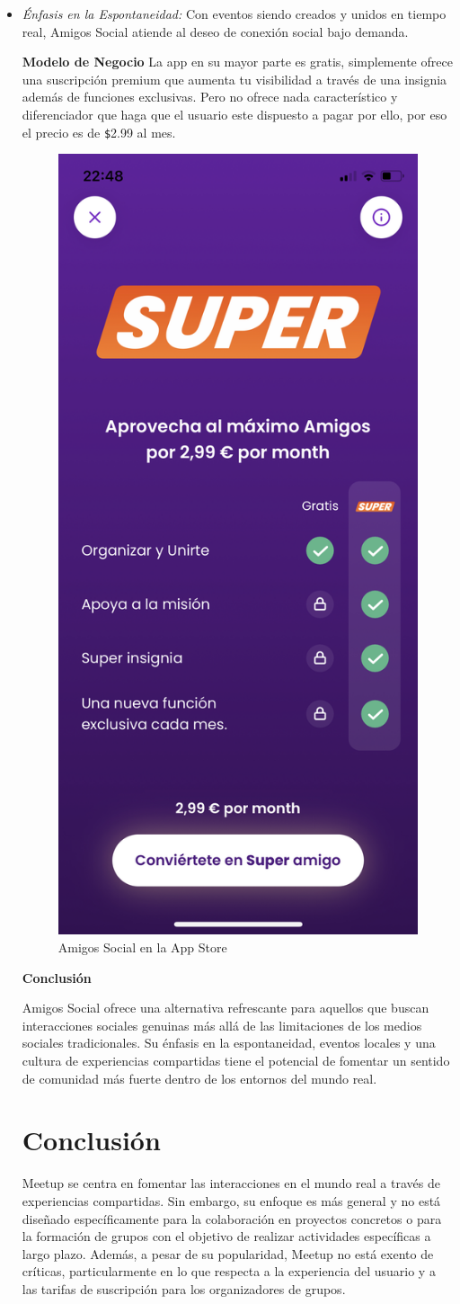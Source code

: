 \begin{itemize}
\item \textit{Énfasis en la Espontaneidad:} Con eventos siendo creados y unidos en tiempo real, Amigos Social atiende al deseo de conexión social bajo demanda.

\textbf{Modelo de Negocio}
La app en su mayor parte es gratis, simplemente ofrece una suscripción premium que aumenta tu visibilidad a través de una insignia además de funciones exclusivas.
Pero no ofrece nada característico y diferenciador que haga que el usuario este dispuesto a pagar por ello, por eso el precio es de \verb|$|2.99 al mes.

\begin{figure}[H]
  \centering
  \includegraphics[cframe=black 2pt,width=0.3\linewidth]{images/estadodelarte/amigossocialsuper.jpeg}
  \caption{Amigos Social en la App Store}
  \label{fig:amigosocial_appstore}
\end{figure}

\textbf{Conclusión}

Amigos Social ofrece una alternativa refrescante para aquellos que buscan interacciones sociales genuinas más allá de las limitaciones de los medios sociales tradicionales. Su énfasis en la espontaneidad, eventos locales y una cultura de experiencias compartidas tiene el potencial de fomentar un sentido de comunidad más fuerte dentro de los entornos del mundo real.


\section{Conclusión}

Meetup se centra en fomentar las interacciones en el mundo real a 
través de experiencias compartidas. Sin embargo, su enfoque es más 
general y no está diseñado específicamente para la colaboración en 
proyectos concretos o para la formación de grupos con el objetivo de 
realizar actividades específicas a largo plazo. Además, a pesar de su 
popularidad, Meetup no está exento de críticas, particularmente en lo 
que respecta a la experiencia del usuario y a las tarifas de suscripción 
para los organizadores de grupos.


\end{itemize}
